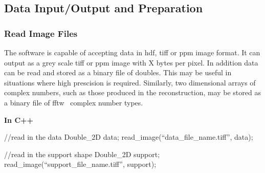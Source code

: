 \documentclass[]{cxs-software}
\begin{document}

\subsection{Data Input/Output and Preparation}

\subsubsection{Read Image Files}

\label{subsec:read_images}

The software is capable of accepting data in hdf, tiff or ppm image
format. It can output as a grey scale tiff or ppm image with X bytes
per pixel. In addition data can be read and stored as a binary file of
doubles. This may be useful in situations where high prescision is
required. Similarly, two dimensional arrays of complex numbers, such
as those produced in the reconstruction, may be stored as a binary
file of fftw~\cite{} complex number types.

{\bf In C++} 
\begin{myverbatim}[language=C++]
  //read in the data
  Double_2D data;
  read_image(``data_file_name.tiff'', data);
  
  //read in the support shape
  Double_2D support;
  read_image(``support_file_name.tiff'', support);
  \end{myverbatim}
\end{document}
